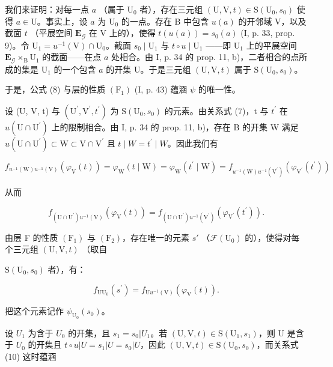 我们来证明：对每一点 \(a\) （属于 \(\mathrm{U}_0\) 者），存在三元组 \((\mathrm{U},\mathrm{V},t)\in \mathrm{S}(\mathrm{U}_0,s_0)\) 使得 \(a\in \mathrm{U}\)。事实上，设 \(a\) 为 \(\mathrm{U}_0\) 的一点。存在 B 中包含 \(u(a)\) 的开邻域 V，以及截面 \(t\) （平展空间 \(\mathbf{E}_{\mathcal{G}}\) 在 V 上的），使得 \(t(u(a)) = s_0(a)\) (I, p. 33, prop. 9)。令 \(\mathrm{U}_1 = u^{-1} (\mathrm{V})\cap \mathrm{U}_0\)。截面 \(s_0\mid \mathrm{U}_1\) 与 \(t\circ u\mid \mathrm{U}_1\) ——即 \(\mathrm{U}_1\) 上的平展空间 \(\mathbf{E}_{\mathcal{G}}\times_{\mathrm{B}}\mathrm{U}_1\) 的截面——在点 \(a\) 处相合。由 I, p. 34 的 prop. 11, b)，二者相合的点所成的集是 \(\mathrm{U}_1\) 的一个包含 \(a\) 的开集 U。于是三元组 \((\mathrm{U},\mathrm{V},t)\) 属于 \(\mathrm{S}(\mathrm{U}_0,s_0)\)。

于是，公式 (8) 与层的性质 \((\mathrm{F}_{1})\) (I, p. 43) 蕴涵 \(\psi\) 的唯一性。

设 (U, V, t) 与 \((\mathrm{U}^{\prime}, \mathrm{V}^{\prime}, t^{\prime})\) 为 \(\mathrm{S}(\mathrm{U}_{0}, s_{0})\) 的元素。由关系式 (7)，t 与 \(t^{\prime}\) 在 \(u(\mathrm{U} \cap \mathrm{U}^{\prime})\) 上的限制相合。由 I, p. 34 的 prop. 11, b)，存在 B 的开集 W 满足 \(u(\mathrm{U} \cap \mathrm{U}^{\prime}) \subset \mathrm{W} \subset \mathrm{V} \cap \mathrm{V}^{\prime}\) 且 \(t \mid W = t^{\prime} \mid W\)。因此我们有

\[
f_{u^{-1}(\mathrm{W})u^{-1}(\mathrm{V})}(\varphi_{\mathrm{V}}(t)) = \varphi_{\mathrm{W}}(t\mid \mathrm{W}) = \varphi_{\mathrm{W}}(t^{\prime}\mid \mathrm{W}) = f_{u^{-1}(\mathrm{W})u^{-1}(\mathrm{V}^{\prime})}(\varphi_{\mathrm{V}^{\prime}}(t^{\prime}))
\]

从而

\[
f_{(\mathrm{U}\cap\mathrm{U}^{\prime})u^{-1}(\mathrm{V})}(\varphi_{\mathrm{V}}(t)) = f_{(\mathrm{U}\cap\mathrm{U}^{\prime})u^{-1}(\mathrm{V}^{\prime})}(\varphi_{\mathrm{V}^{\prime}}(t^{\prime})).\tag{9}
\]

由层 F 的性质 \((\mathrm{F}_{1})\) 与 \((\mathrm{F}_{2})\)，存在唯一的元素 \(s'\) （\(\mathcal{F}(\mathrm{U}_{0})\) 的），使得对每个三元组 \((\mathrm{U},\mathrm{V},t)\) （取自

\(\mathrm{S}(\mathrm{U}_{0},s_{0})\) 者），有：

\[
f_{\mathrm{U}\mathrm{U}_{0}}(s^{\prime}) = f_{\mathrm{U}u^{-1}(\mathrm{V})}(\varphi_{\mathrm{V}}(t)).\tag{10}
\]

把这个元素记作 \(\psi_{\mathrm{U}_{0}}(s_{0})\)。

设 \(U_{1}\) 为含于 \(U_{0}\) 的开集，且 \(s_{1}=s_{0}|U_{1}\)。若 \((\mathrm{U},\mathrm{V},t)\in\mathrm{S}(\mathrm{U}_{1},s_{1})\)，则 U 是含于 \(U_{0}\) 的开集且 \(t\circ u|U=s_{1}|U=s_{0}|U\)，因此 \((\mathrm{U},\mathrm{V},t)\in\mathrm{S}(\mathrm{U}_{0},s_{0})\)，而关系式 (10) 这时蕴涵

